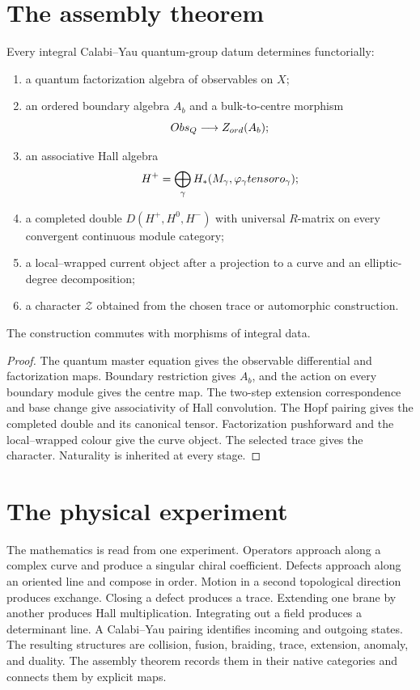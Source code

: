 \chapter{The assembly theorem}
\begin{theorem}
Every integral Calabi--Yau quantum-group datum determines functorially:
\begin{enumerate}
\item a quantum factorization algebra of observables on $X$;
\item an ordered boundary algebra $A_b$ and a bulk-to-centre morphism
\[
 Obs_Q\longrightarrow Z_{ord}(A_b);
\]
\item an associative Hall algebra
\[
 H^+=\bigoplus_\gamma H_*(M_\gamma,\varphi_\gamma tensor o_\gamma);
\]
\item a completed double $D(H^+,H^0,H^-)$ with universal $R$-matrix on every convergent continuous module category;
\item a local--wrapped current object after a projection to a curve and an elliptic-degree decomposition;
\item a character $\mathcal Z$ obtained from the chosen trace or automorphic construction.
\end{enumerate}
The construction commutes with morphisms of integral data.
\end{theorem}
\begin{proof}
The quantum master equation gives the observable differential and factorization maps.  Boundary restriction gives $A_b$, and the action on every boundary module gives the centre map.  The two-step extension correspondence and base change give associativity of Hall convolution.  The Hopf pairing gives the completed double and its canonical tensor.  Factorization pushforward and the local--wrapped colour give the curve object.  The selected trace gives the character.  Naturality is inherited at every stage.
\end{proof}

\chapter{The physical experiment}
The mathematics is read from one experiment.  Operators approach along a complex curve and produce a singular chiral coefficient.  Defects approach along an oriented line and compose in order.  Motion in a second topological direction produces exchange.  Closing a defect produces a trace.  Extending one brane by another produces Hall multiplication.  Integrating out a field produces a determinant line.  A Calabi--Yau pairing identifies incoming and outgoing states.  The resulting structures are collision, fusion, braiding, trace, extension, anomaly, and duality.  The assembly theorem records them in their native categories and connects them by explicit maps.
